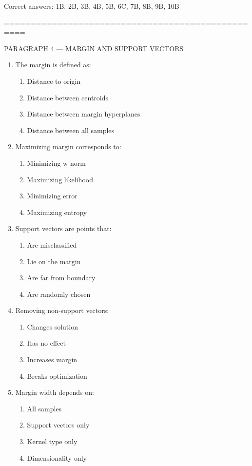 \documentclass{article}
\begin{document}
	Correct answers: 1B, 2B, 3B, 4B, 5B, 6C, 7B, 8B, 9B, 10B
	
	\bigskip
	==================================================
	
	PARAGRAPH 4 — MARGIN AND SUPPORT VECTORS
	
	\begin{enumerate}
		\item The margin is defined as:
		\begin{enumerate}
			\item Distance to origin
			\item Distance between centroids
			\item Distance between margin hyperplanes
			\item Distance between all samples
		\end{enumerate}
		
		\item Maximizing margin corresponds to:
		\begin{enumerate}
			\item Minimizing w norm
			\item Maximizing likelihood
			\item Minimizing error
			\item Maximizing entropy
		\end{enumerate}
		
		\item Support vectors are points that:
		\begin{enumerate}
			\item Are misclassified
			\item Lie on the margin
			\item Are far from boundary
			\item Are randomly chosen
		\end{enumerate}
		
		\item Removing non-support vectors:
		\begin{enumerate}
			\item Changes solution
			\item Has no effect
			\item Increases margin
			\item Breaks optimization
		\end{enumerate}
		
		\item Margin width depends on:
		\begin{enumerate}
			\item All samples
			\item Support vectors only
			\item Kernel type only
			\item Dimensionality only
		\end{enumerate}
		

\end{enumerate}
\end{document}
